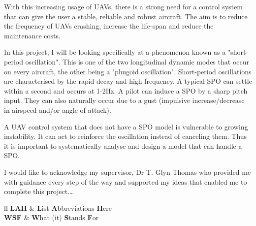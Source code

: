 \documentclass[
11pt, %
english, %
onehalfspacex, %
headsepline, %
] %
{MastersDoctoralThesis}
\begin{document}
With this increasing usage of UAVs, there is a strong need for a control system that can give the user a stable, reliable and robust aircraft. The aim is to reduce the frequency of UAVs crashing, increase the life-span and reduce the maintenance costs. 

In this project, I will be looking specifically at a phenomenon known as a "short-period oscillation". This is one of the two longitudinal dynamic modes that occur on every aircraft, the other being a "phugoid oscillation". Short-period oscillations are characterised by the rapid decay and high frequency. A typical SPO can settle within a second and occurs at 1-2Hz. A pilot can induce a SPO by a sharp pitch input. They can also naturally occur due to a gust (impulsive increase/decrease in airspeed and/or angle of attack). 

A UAV control system that does not have a SPO model is vulnerable to growing instability. It can act to reinforce the oscillation instead of canceling them. Thus it is important to systematically analyse and design a model that can handle a SPO.  
\newpage
\begingroup
\let\clearpage\relax
\let\cleardoublepage\relax
\begin{acknowledgements}
\thispagestyle{fancy}
I would like to acknowledge my supervisor, Dr T. Glyn Thomas who provided me with guidance every step of the way and supported my ideas that enabled me to complete this project.\ldots

\end{acknowledgements}
\endgroup
\newpage
\begingroup
\let\clearpage\relax
\let\cleardoublepage\relax
\begin{abbreviations}{ll} %
\thispagestyle{fancy}
\textbf{LAH} & \textbf{L}ist \textbf{A}bbreviations \textbf{H}ere\\
\textbf{WSF} & \textbf{W}hat (it) \textbf{S}tands \textbf{F}or\\

\end{abbreviations}
\endgroup
\newpage
\end{document}
